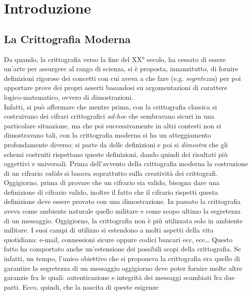\documentclass[a4paper,openright,twoside,12pt]{report}
\author{Gian Pietro Farina}
\renewcommand{\chaptermark}[1]{\markboth{#1}{}}
\begin{document}
\chapter*{} 
\thispagestyle{empty} 
\addtocounter{page}{-1} 
\tableofcontents
\chapter*{Introduzione}
\chaptermark{Introduzione}
\section*{La Crittografia Moderna}
Da quando, la crittografia verso la fine del XX° secolo, ha cessato di essere un'arte per assurgere al rango di scienza, 
si \`e proposta, innanzitutto, di fornire definizioni rigorose dei concetti con cui aveva a che fare (e.g. \emph{segretezza}) per poi apportare prove dei propri asserti basandosi 
su argomentazioni di carattere logico-matematico, ovvero di dimostrazioni. \\ Infatti, si pu\`o affermare che mentre prima,
con la crittografia classica si costruivano dei cifrari crittografici \emph{ad-hoc} che sembravano sicuri in una particolare situazione, ma che poi successivamente in altri contesti
non si dimostravano tali, con la crittografia moderna si ha un atteggiamento profondamente diverso: si parte da delle definizioni e poi
si \emph{dimostra} che gli schemi costruiti rispettano queste definizioni, dando quindi dei risultati pi\`u oggettivi e universali.
Prima dell'avvento della crittografia moderna la costruzione di un cifrario \emph{valido} si basava soprattutto sulla creativit\`a 
dei crittografi. Oggigiorno, prima di provare che un cifrario sia valido, bisogna dare una definizione di cifrario valido, 
inoltre il fatto
che il cifrario rispetti questa definizione deve essere provato con una dimostrazione.
In passato la crittografia aveva come ambiente naturale quello militare e come scopo ultimo la segretezza di un messaggio.
Oggigiorno, la crittografia non \`e pi\`u utilizzata solo in ambiente militare. I suoi campi di utilizzo si estendono a molti aspetti 
della vita quotidiana: e-mail, connessioni sicure oppure codici bancari ecc, ecc\dots
Questo fatto ha comportato anche un'estensione dei possibili scopi della crittografia. Se infatti, un tempo, l'unico obiettivo che si proponeva la crittografia era quello di garantire
la segretezza di un messaggio oggigiorno deve poter fornire molte altre garanzie fra le quali: autenticazione e integrit\`a dei messaggi scambiati fra due parti. Ecco, quindi, che la nascita di queste esigenze
\end{document}
